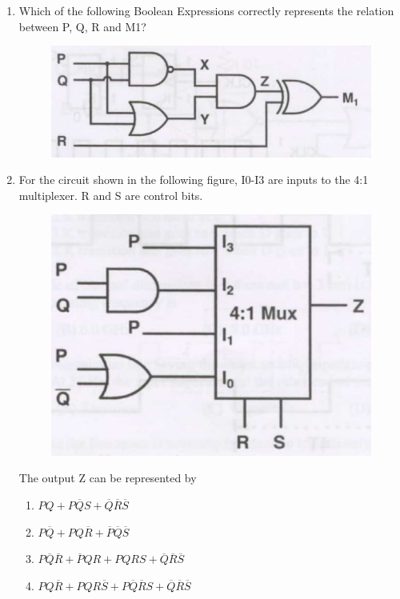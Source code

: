 \documentclass[a4paper, 11pt]{article}
\begin{document}
\begin{enumerate}
    \item Which of the following Boolean Expressions correctly represents the relation between P, Q, R and M1?
    \begin{figure}[H]
        \centering
        \includegraphics[width=0.7\columnwidth]{q57}
        \caption*{}
        \label{fig:q57}
    \end{figure}
    \begin{enumerate}
    \end{enumerate}
    
    \hfill{}
    
    \item For the circuit shown in the following figure, I0-I3 are inputs to the 4:1 multiplexer. R  and S are control bits.
    \begin{figure}[H]
        \centering
        \includegraphics[width=0.6\columnwidth]{q58}
        \caption*{}
        \label{fig:q58}
    \end{figure}
    The output Z can be represented by
    \begin{enumerate}
        \item $PQ+P\overline{Q}S+\overline{Q}\overline{R}\overline{S}$
        \item $P\overline{Q}+PQ\overline{R}+\overline{P}\overline{Q}\overline{S}$
        \item $P\overline{Q}\overline{R}+\overline{P}QR+PQRS+\overline{Q}\overline{R}\overline{S}$
        \item $PQ\overline{R}+PQR\overline{S}+P\overline{Q}\overline{R}S+\overline{Q}\overline{R}\overline{S}$
    \end{enumerate}
    

\end{enumerate}
\end{document}
